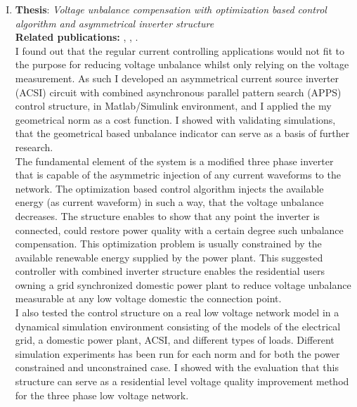 \begin{enumerate}[I.)]
\item\textbf{Thesis}: \emph{Voltage unbalance compensation with optimization based control algorithm and asymmetrical inverter structure}\\
    \textbf{Related publications:} \cite{Neukirchner2015}, \cite{neukirchner2016voltage}, \cite{neukirchner2017voltage}.\\
     I found out that the regular current controlling applications would not fit to the purpose for reducing voltage unbalance whilst only relying on the voltage measurement. As such I developed an asymmetrical current source inverter (ACSI) circuit with combined asynchronous parallel pattern search (APPS) control structure, in Matlab/Simulink environment, and I applied the my geometrical norm as a cost function. I showed with validating simulations, that the geometrical based unbalance indicator can serve as a basis of further research. \\
		The fundamental element of the system is a modified three phase inverter that is capable of the asymmetric injection of any current waveforms to the network. The optimization based control algorithm injects the available energy (as current waveform) in such a way, that the voltage unbalance decreases. The structure enables to show that any point the inverter is connected, could restore power quality with a certain degree such unbalance compensation. This optimization problem is usually constrained by the available renewable energy supplied by the power plant. This suggested controller with combined inverter structure enables the residential users owning a grid synchronized domestic power plant to reduce voltage unbalance measurable at any low voltage domestic the connection point. \\
    I also tested the control structure on a real low voltage network model in a dynamical simulation environment consisting of the models of the electrical grid, a domestic power plant, ACSI, and different types of loads. Different simulation experiments has been run for each norm and for both the power constrained and unconstrained case. I showed with the evaluation that this structure can serve as a residential level voltage quality improvement method for the three phase low voltage network.\\
		

\end{enumerate}
